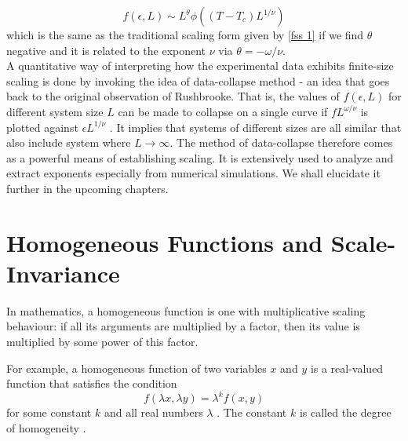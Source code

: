 	\begin{equation}
		f(\epsilon, L) \sim L^\theta \phi((T-T_c)L^{1/\nu})
	\end{equation}
	which is the same as the traditional scaling form given by \ref{fss 1} if we find $\theta$ negative and it is related to the exponent $\nu$ via $\theta=-\omega/\nu$.\\
	A quantitative way of interpreting how the experimental data exhibits finite-size scaling is done by invoking the idea of data-collapse method - an idea that goes back to the original observation of Rushbrooke. That is, the values of $f(\epsilon,L)$ for different system size $L$ can be	made to collapse on a single curve if $f L^{\omega/\nu}$ is plotted against $\epsilon L ^{1/\nu}$ . It	implies that systems of different sizes are all similar that also include	system where $L \rightarrow \infty$. The method of data-collapse therefore comes as	a powerful means of establishing scaling. It is extensively used to analyze and extract exponents especially from numerical simulations. We	shall elucidate it further in the upcoming chapters.
	
	
	
\section{Homogeneous Functions and Scale-Invariance}
	\label{sect:homogenious-function}
	In mathematics, a homogeneous function is one with multiplicative scaling behaviour: if all its arguments are multiplied by a factor, then its value is multiplied by some power of this factor.
	
	For example, a homogeneous function of two variables $x$ and $y$ is a real-valued function that satisfies the condition
	\begin{equation}
		f(\lambda x, \lambda y) = \lambda^k f(x,y)
	\end{equation} 
	 for some constant $k$ and all real numbers $\lambda$ . The constant  $k$ is called the degree of homogeneity \cite{Kluwer1994}.
	
	
